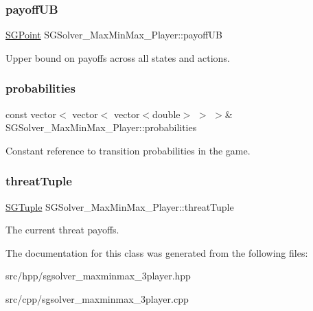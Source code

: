 \subsubsection{\texorpdfstring{payoff\+UB}{payoffUB}}
{\footnotesize\ttfamily \hyperlink{classSGPoint}{S\+G\+Point} S\+G\+Solver\+\_\+\+Max\+Min\+Max\+\_\+Player\+::payoff\+UB\hspace{0.3cm}{\ttfamily [private]}}

Upper bound on payoffs across all states and actions. \mbox{\label{classSGSolver__MaxMinMax__3Player_ae07f2726d67a2add5ebffc21b98ce6db}} 
\subsubsection{\texorpdfstring{probabilities}{probabilities}}
{\footnotesize\ttfamily const vector$<$ vector$<$ vector$<$double$>$ $>$ $>$\& S\+G\+Solver\+\_\+\+Max\+Min\+Max\+\_\+Player\+::probabilities\hspace{0.3cm}{\ttfamily [private]}}

Constant reference to transition probabilities in the game. \mbox{\label{classSGSolver__MaxMinMax__3Player_a52695bd70d1ed1ab7f7dc647793b3bca}} 
\subsubsection{\texorpdfstring{threat\+Tuple}{threatTuple}}
{\footnotesize\ttfamily \hyperlink{classSGTuple}{S\+G\+Tuple} S\+G\+Solver\+\_\+\+Max\+Min\+Max\+\_\+Player\+::threat\+Tuple\hspace{0.3cm}{\ttfamily [private]}}

The current threat payoffs. 

The documentation for this class was generated from the following files\+:\begin{DoxyCompactItemize}
\item 
src/hpp/sgsolver\+\_\+maxminmax\+\_\+3player.\+hpp\item 
src/cpp/sgsolver\+\_\+maxminmax\+\_\+3player.\+cpp\end{DoxyCompactItemize}
